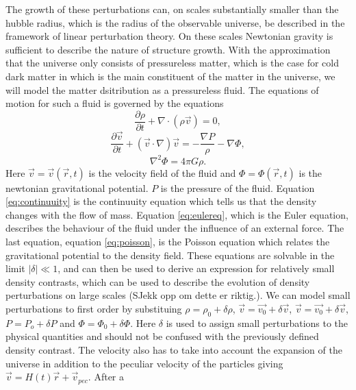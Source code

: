 The growth of these perturbations can, on scales substantially smaller than the
hubble radius, which is the radius of the observable universe, be described in
the framework of linear perturbation theory. On these scales Newtonian gravity
is sufficient to describe the nature of structure growth. With the approximation
that the universe only consists of pressureless matter, which is the case for
cold dark matter in which is the main constituent of the matter in the universe, we
will model the matter dsitribution as a pressureless fluid. The equations of
motion for such a fluid is governed by the equations
\begin{equation}\label{eq:continuuity}
    \frac{\partial \rho}{\partial t} + \nabla\cdot(\rho \vec{v})=0,
\end{equation}
\begin{equation}\label{eq:eulereq}
    \frac{\partial \vec{v}}{\partial t} + (\vec{v}\cdot\nabla)\vec{v}=-\frac{\nabla P}{\rho}-\nabla \Phi,
\end{equation}
\begin{equation}\label{eq:poisson}
    \nabla ^2\Phi=4\pi G\rho.
\end{equation}
Here $\vec{v}=\vec{v}(\vec{r},t)$ is the velocity field of the fluid and $\Phi=\Phi(\vec{r},t)$
is the newtonian gravitational potential. $P$ is the pressure of the fluid. Equation \ref{eq:continuuity} is the
continuuity equation which tells us that the density changes with the flow of
mass. Equation \ref{eq:eulereq}, which is the Euler equation, describes the
behaviour of the fluid under the influence of an external force. The last
equation, equation \ref{eq:poisson}, is the Poisson equation which relates the
gravitational potential to the density field. These equations are solvable in
the limit $\vert\delta\vert \ll 1$, and can then be used to derive an expression
for relatively small density contrasts, which can be used to describe the
evolution of density perturbations on large scales (SJekk opp om dette er
riktig.). We can model small perturbations to first order by substituing $\rho =
\rho_0 + \delta \rho$, $\vec{v} =\vec{v_0} + \delta \vec{v}$, $\vec{v} =\vec{v_0}
+ \delta \vec{v}$, $P = P_o + \delta P$ and $\Phi = \Phi_0 +\delta\Phi$. Here
$\delta$ is used to assign small perturbations to the physical quantities and should not be
confused with the previously defined density contrast. The velocity also has to
take into account the expansion of the universe in addition to the peculiar
velocity of the particles giving $\vec{v} = H(t)\vec{r} + \vec{v}_{pec}$. After a
